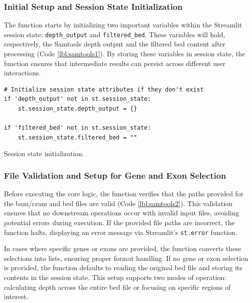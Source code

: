 \subsubsection{\textbf{Initial Setup and Session State Initialization}}

The function starts by initializing two important variables within the Streamlit session state: \texttt{depth\_output} and \texttt{filtered\_bed}. These variables will hold, respectively, the Samtools depth output and the filtered \ac{bed} content after processing (Code \ref{lbl:samtools1}). By storing these variables in session state, the function ensures that intermediate results can persist across different user interactions.

\begin{longlisting}
\begin{verbatim}
# Initialize session state attributes if they don't exist
if 'depth_output' not in st.session_state:
    st.session_state.depth_output = {}
    
if 'filtered_bed' not in st.session_state:
    st.session_state.filtered_bed = ""
\end{verbatim}
\caption{Session state initialization.}
\label{lbl:samtools1}
\end{longlisting}

\subsubsection{\textbf{File Validation and Setup for Gene and Exon Selection}}

Before executing the core logic, the function verifies that the paths provided for the \ac{bam}/\ac{cram} and \ac{bed} files are valid (Code \ref{lbl:samtools2}). This validation ensures that no downstream operations occur with invalid input files, avoiding potential errors during execution. If the provided file paths are incorrect, the function halts, displaying an error message via Streamlit's \texttt{st.error} function.

In cases where specific genes or exons are provided, the function converts these selections into lists, ensuring proper format handling. If no gene or exon selection is provided, the function defaults to reading the original \ac{bed} file and storing its contents in the session state. This setup supports two modes of operation: calculating depth across the entire \ac{bed} file or focusing on specific regions of interest.

